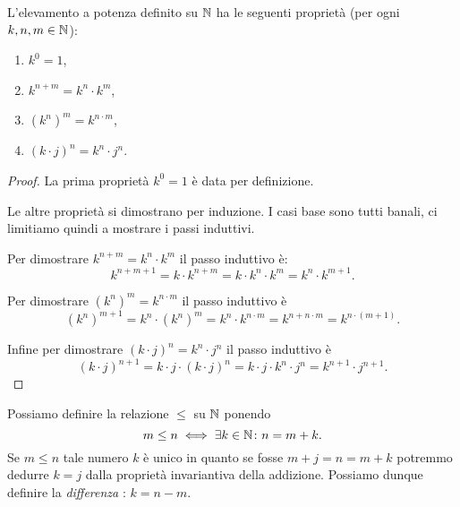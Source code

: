 \begin{theorem}
  \label{th:proprieta_potenza}%
  L'elevamento a potenza definito su ${\mathbb N}$ ha le seguenti proprietà
  (per ogni $k,n,m\in {\mathbb N}$):
  \begin{enumerate}
    \item $k^0 = 1$,
    \item $k^{n+m} = k^n \cdot k^m$,
    \item $(k^n)^m = k^{n\cdot m}$,
    \item $(k\cdot j)^n = k^n\cdot j^n$. 
  \end{enumerate}
\end{theorem}
%
\begin{proof}
La prima proprietà $k^0=1$ è data per definizione.

Le altre proprietà si dimostrano per induzione.
I casi base sono tutti banali, ci limitiamo quindi 
a mostrare i passi induttivi.

Per dimostrare $k^{n+m}=k^n\cdot k^m$ il passo induttivo è:
\[
k^{n+m+1} 
= k\cdot k^{n+m}  
= k\cdot k^n\cdot k^m
= k^n \cdot k^{m+1}.
\]

Per dimostrare $(k^n)^m = k^{n\cdot m}$ il passo induttivo è 
\[
  (k^n)^{m+1} 
  = k^n\cdot (k^n)^m
  = k^n\cdot k^{n\cdot m}
  = k^{n+n\cdot m}
  = k^{n\cdot(m+1)}.
\]

Infine per dimostrare $(k\cdot j)^n = k^n\cdot j^n$ 
il passo induttivo è
\[
(k\cdot j)^{n+1} 
= k\cdot j\cdot (k\cdot j)^n  
= k\cdot j\cdot k^n\cdot j^n
= k^{n+1}\cdot j^{n+1}.
\]
\end{proof}

Possiamo definire la relazione $\le$ su ${\mathbb N}$ ponendo 
\[
  m \le n \iff \exists k\in {\mathbb N}\colon n = m+k.  
\]
Se $m\le n$ tale numero 
$k$ è unico in quanto se fosse $m+j=n=m+k$ potremmo dedurre $k=j$
dalla proprietà invariantiva della addizione. 
Possiamo dunque definire la \emph{differenza}%
%
: $k=n-m$.

